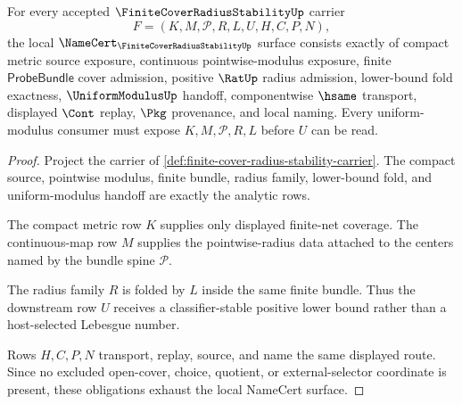 \begin{theorem}
\label{thm:finite-cover-radius-stability-obligations}
For every accepted $\FiniteCoverRadiusStabilityUp$ carrier
$$
F=(K,M,\mathcal{P},R,L,U,H,C,P,N),
$$
the local $\NameCert_{\FiniteCoverRadiusStabilityUp}$ surface consists exactly of compact metric source exposure, continuous pointwise-modulus exposure, finite $\mathsf{ProbeBundle}$ cover admission, positive $\RatUp$ radius admission, lower-bound fold exactness, $\UniformModulusUp$ handoff, componentwise $\hsame$ transport, displayed $\Cont$ replay, $\Pkg$ provenance, and local naming. Every uniform-modulus consumer must expose $K,M,\mathcal{P},R,L$ before $U$ can be read.
\end{theorem}
\begin{proof}
Project the carrier of \autoref{def:finite-cover-radius-stability-carrier}. The compact source, pointwise modulus, finite bundle, radius family, lower-bound fold, and uniform-modulus handoff are exactly the analytic rows.

The compact metric row $K$ supplies only displayed finite-net coverage. The continuous-map row $M$ supplies the pointwise-radius data attached to the centers named by the bundle spine $\mathcal{P}$.

The radius family $R$ is folded by $L$ inside the same finite bundle. Thus the downstream row $U$ receives a classifier-stable positive lower bound rather than a host-selected Lebesgue number.

Rows $H,C,P,N$ transport, replay, source, and name the same displayed route. Since no excluded open-cover, choice, quotient, or external-selector coordinate is present, these obligations exhaust the local NameCert surface.
\end{proof}

